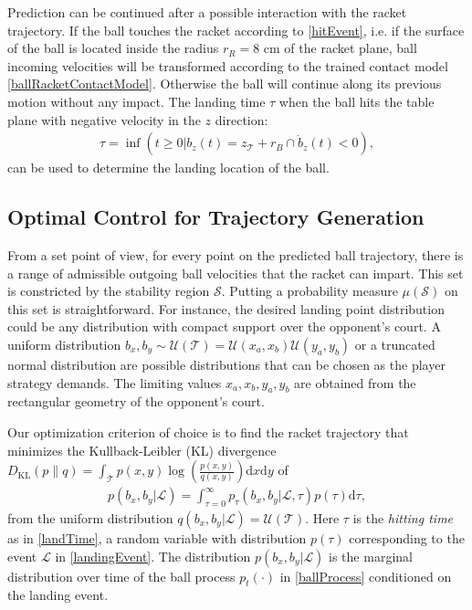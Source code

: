 \documentclass[letterpaper, 10 pt, conference]{ieeeconf}
\newcommand{\ballRadius}{r_B}
\newcommand{\racketRadius}{r_R} %
\newcommand{\stabilityRegion}{\mathcal{S}} %
\newcommand{\court}{\mathcal{T}} %
\newcommand{\landTime}{\tau} %
\newcommand{\landEvent}{\mathcal{L}} %
\newcommand{\landDist}{p(\tau)} %
\newcommand{\KL}{D_{\mathrm{KL}}}
\begin{document}
%
Prediction can be continued after a possible interaction with the racket trajectory. If the ball touches the racket according to \eqref{hitEvent}, i.e. if the surface of the ball is located inside the radius $\racketRadius = 8$ cm of the racket plane, ball incoming velocities will be transformed according to the trained contact model \eqref{ballRacketContactModel}. Otherwise the ball will continue along its previous motion without any impact. The landing time $\landTime$ when the ball hits the table plane with negative velocity in the $z$ direction: 
%
\begin{align}
\landTime = \inf(t \geq 0 | b_z(t) = z_{\court} + \ballRadius \cap \dot{b}_z(t) < 0),
\label{landTime}
\end{align}
%
can be used to determine the landing location of the ball. 

\subsection{Optimal Control for Trajectory Generation}

From a set point of view, for every point on the predicted ball trajectory, there is a range of admissible outgoing ball velocities that the racket can impart. This set is constricted by the stability region $\stabilityRegion$. 
Putting a probability measure $\mu(\stabilityRegion)$ on this set is straightforward. For instance, the desired landing point distribution could be any distribution with compact support over the opponent's court. A uniform distribution $b_x, b_y \sim \mathcal{U}(\court) = \mathcal{U}(x_{a},x_{b})\mathcal{U}(y_{a},y_{b})$ or a truncated normal distribution are possible distributions that can be chosen as the player strategy demands. The limiting values $x_{a},x_{b},y_{a},y_{b}$ are obtained from the rectangular geometry of the opponent's court.
%

Our optimization criterion of choice is to find the racket trajectory that minimizes the Kullback-Leibler (KL) divergence $\KL(p\|q) = \int_{\court}p(x,y)\log(\frac{p(x,y)}{q(x,y)})\textrm{d}x\textrm{d}y$ of 
%
\begin{align}
p(b_x,b_y|\landEvent) = \int_{\landTime = 0}^{\infty} p_{\landTime}(b_x,b_y|\landEvent,\landTime)\landDist \textrm{d}\landTime,
\label{marginalProcess}
\end{align}
%
\noindent from the uniform distribution $q(b_x,b_y|\landEvent) = \mathcal{U}(\court)$. Here $\landTime$ is the \emph{hitting time} as in \eqref{landTime}, a random variable with distribution $p(\landTime)$ corresponding to the event $\landEvent$ in \eqref{landingEvent}. The distribution $p(b_x,b_y|\landEvent)$ is the marginal distribution over time of the ball process $p_t(\cdot)$ in \eqref{ballProcess} conditioned on the landing event.
\end{document}
